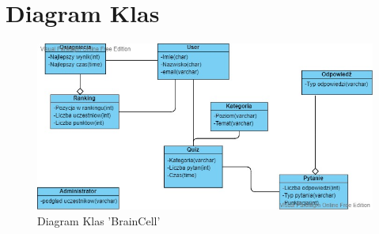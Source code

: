 	\newpage
\section{Diagram Klas}		%

\begin{figure}[!htb]
	\begin{center}
		\includegraphics[width=15cm]{rys/diagram klas.png}
		\caption{Diagram Klas 'BrainCell'}
		\label{rys:rysunek003}
	\end{center}
\end{figure} 




